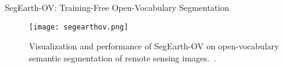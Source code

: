 \begin{refsection}
  \begin{frame}{SegEarth-OV: Training-Free Open-Vocabulary Segmentation}
    \begin{figure}
      \centering
      \texttt{[image: segearthov.png]}
      \caption[]{\scriptsize Visualization and performance of SegEarth-OV on open-vocabulary semantic segmentation of remote sensing images.~\parencite{liSegEarthOVTrainingFreeOpenVocabulary2025}.}
    \end{figure}
    \bottomleftrefs
  \end{frame}
\end{refsection}



